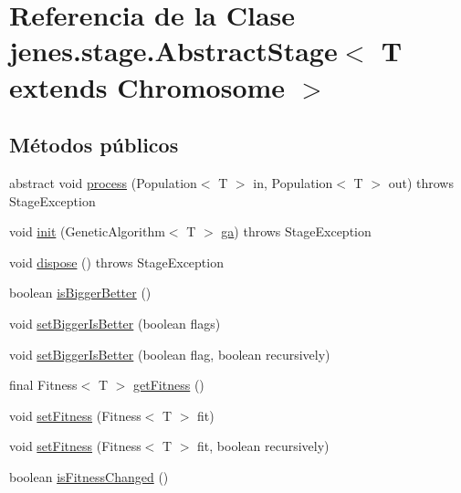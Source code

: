 \hypertarget{classjenes_1_1stage_1_1_abstract_stage_3_01_t_01extends_01_chromosome_01_4}{\section{Referencia de la Clase jenes.\-stage.\-Abstract\-Stage$<$ T extends Chromosome $>$}
\label{classjenes_1_1stage_1_1_abstract_stage_3_01_t_01extends_01_chromosome_01_4}
}
\subsection*{Métodos públicos}
\begin{DoxyCompactItemize}
\item 
abstract void \hyperlink{classjenes_1_1stage_1_1_abstract_stage_3_01_t_01extends_01_chromosome_01_4_a1e8398b28d820dc0e7343b15ce19c703}{process} (Population$<$ T $>$ in, Population$<$ T $>$ out)  throws Stage\-Exception
\item 
void \hyperlink{classjenes_1_1stage_1_1_abstract_stage_3_01_t_01extends_01_chromosome_01_4_af16b278b3f7a6d9fd78e742621b956e5}{init} (Genetic\-Algorithm$<$ T $>$ \hyperlink{classjenes_1_1stage_1_1_abstract_stage_3_01_t_01extends_01_chromosome_01_4_a751aba4f46b29d22592d48422ffa75f9}{ga})  throws Stage\-Exception 
\item 
void \hyperlink{classjenes_1_1stage_1_1_abstract_stage_3_01_t_01extends_01_chromosome_01_4_a68d4104c004b50abf7b12ffc94122ddc}{dispose} ()  throws Stage\-Exception 
\item 
boolean \hyperlink{classjenes_1_1stage_1_1_abstract_stage_3_01_t_01extends_01_chromosome_01_4_ac20363682ebc9214d9253ff157a06a2d}{is\-Bigger\-Better} ()
\item 
void \hyperlink{classjenes_1_1stage_1_1_abstract_stage_3_01_t_01extends_01_chromosome_01_4_adfddd6664c7f9f2eeba94d59de6fcebf}{set\-Bigger\-Is\-Better} (boolean flags)
\item 
void \hyperlink{classjenes_1_1stage_1_1_abstract_stage_3_01_t_01extends_01_chromosome_01_4_a003250025de6f005e247a05b107e5e8f}{set\-Bigger\-Is\-Better} (boolean flag, boolean recursively)
\item 
final Fitness$<$ T $>$ \hyperlink{classjenes_1_1stage_1_1_abstract_stage_3_01_t_01extends_01_chromosome_01_4_a9de5f0a09b7791fe1e93123ada1c434a}{get\-Fitness} ()
\item 
void \hyperlink{classjenes_1_1stage_1_1_abstract_stage_3_01_t_01extends_01_chromosome_01_4_ad60267d0a803c2991ac3ef02ababef2b}{set\-Fitness} (Fitness$<$ T $>$ fit)
\item 
void \hyperlink{classjenes_1_1stage_1_1_abstract_stage_3_01_t_01extends_01_chromosome_01_4_aff1c8307dc89c4fcf7f253b50a87464d}{set\-Fitness} (Fitness$<$ T $>$ fit, boolean recursively)
\item 
boolean \hyperlink{classjenes_1_1stage_1_1_abstract_stage_3_01_t_01extends_01_chromosome_01_4_a811a041cd505ad8400b3c8b2aa36f4a9}{is\-Fitness\-Changed} ()
\end{DoxyCompactItemize}
